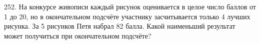 252. На конкурсе живописи каждый рисунок оценивается в целое число баллов от 1 до 20, но в окончательном подсчёте участнику засчитывается только 4 лучших рисунка. За 5 рисунков Петя набрал 82 балла. Какой наименьший результат может получиться при окончательном подсчёте?\\
